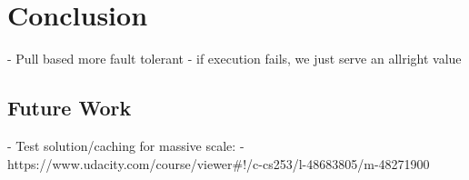 \chapter{Conclusion}
\label{chapter:conclusion}

- Pull based more fault tolerant - if execution fails, we just serve an allright value

\section{Future Work}
\label{sec:future_work}

- Test solution/caching for massive scale:
  - https://www.udacity.com/course/viewer#!/c-cs253/l-48683805/m-48271900





